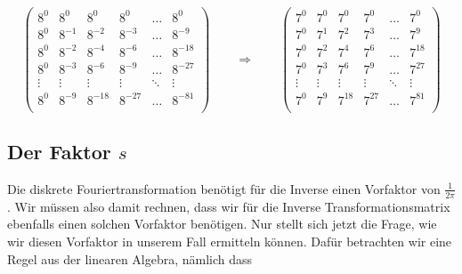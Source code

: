 \[
\begin{pmatrix}
	8^0 & 8^0 & 8^0 & 8^0 & \dots & 8^0 \\
	8^0 & 8^{-1} & 8^{-2} & 8^{-3} & \dots & 8^{-9} \\
	8^0 & 8^{-2} & 8^{-4} & 8^{-6} & \dots & 8^{-18} \\
	8^0 & 8^{-3} & 8^{-6} & 8^{-9} & \dots & 8^{-27} \\
 	\vdots & \vdots & \vdots & \vdots & \ddots & \vdots \\
	8^0 & 8^{-9} & 8^{-18} & 8^{-27} & \dots & 8^{-81} \\
\end{pmatrix}
\qquad
\Rightarrow
\qquad
\begin{pmatrix}
	7^0 & 7^0 & 7^0 & 7^0 & \dots & 7^0 \\
	7^0 & 7^{1} & 7^{2} & 7^{3} & \dots & 7^{9} \\
	7^0 & 7^{2} & 7^{4} & 7^{6} & \dots & 7^{18} \\
	7^0 & 7^{3} & 7^{6} & 7^{9} & \dots & 7^{27} \\
	\vdots & \vdots & \vdots & \vdots & \ddots & \vdots \\
	7^0 & 7^{9} & 7^{18} & 7^{27} & \dots & 7^{81} \\
\end{pmatrix}
\] 

\subsection{Der Faktor $s$
	\label{reedsolomon:subsection:sfaktor}}
Die diskrete Fouriertransformation benötigt für die Inverse einen Vorfaktor von $\frac{1}{2\pi}$.
Wir müssen also damit rechnen, dass wir für die Inverse Transformationsmatrix ebenfalls einen solchen Vorfaktor benötigen.
Nur stellt sich jetzt die Frage, wie wir diesen Vorfaktor in unserem Fall ermitteln können.
Dafür betrachten wir eine Regel aus der linearen Algebra, nämlich dass

